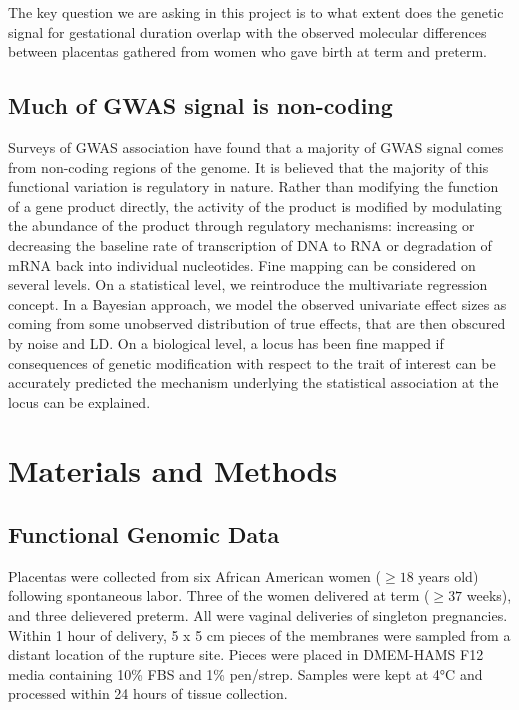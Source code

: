 The key question we are asking in this project is to what extent does the genetic signal for gestational duration overlap with the observed molecular differences between placentas gathered from women who gave birth at term and preterm.

\subsection{Much of GWAS signal is non-coding}\label{sec:org3ac0b01}

Surveys of GWAS association have found that a majority of GWAS signal comes from non-coding regions of the genome.  It is believed that the majority 
of this functional variation is regulatory in nature.  Rather than modifying the function of a gene product directly, the activity of the product is modified
by modulating the abundance of the product through regulatory mechanisms: increasing or decreasing the baseline rate of transcription of DNA to RNA or degradation of mRNA back into individual nucleotides.  
Fine mapping can be considered on several levels.
On a statistical level, we reintroduce the multivariate regression concept.
In a Bayesian approach, we model the observed univariate effect sizes as coming from some unobserved distribution of true effects,
that are then obscured by noise and LD.
On a biological level, a locus has been fine mapped if consequences of genetic modification with respect to the trait of
interest can be accurately predicted the mechanism underlying the statistical association at the locus can be explained.

\section{Materials and Methods}\label{sec:org39326e2}
\subsection{Functional Genomic Data}\label{sec:org702e301}
  
Placentas were collected from six African American women (\(\geq 18\) years old) following spontaneous labor.
Three of the women delivered at term (\(\geq 37\) weeks), and three delievered preterm.
All were vaginal deliveries of singleton pregnancies. Within 1 hour of delivery, 5 x 5 cm pieces of the membranes were
sampled from a distant location of the rupture site. Pieces were placed in DMEM-HAMS F12 media containing 10\% FBS and
1\% pen/strep. Samples were kept at 4°C and processed within 24 hours of tissue collection.


